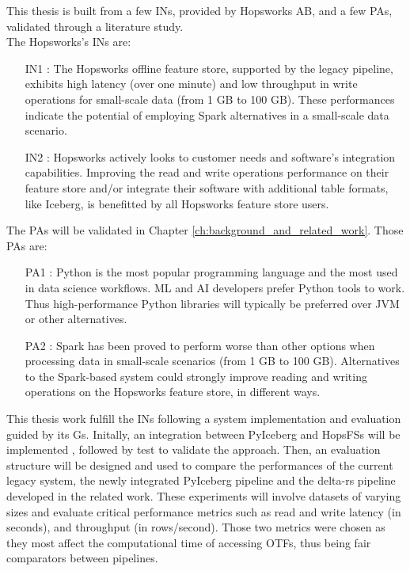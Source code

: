 This thesis is built from a few \glspl{IN}, provided by Hopsworks AB, and a few \glspl{PA}, validated through a literature study. \\ The Hopsworks's \glspl{IN} are:
\begin{itemize}
    \item[IN1 :] The Hopsworks offline feature store, supported by the legacy pipeline, exhibits high latency (over one minute) and low throughput in write operations for small-scale data (from 1 GB to 100 GB). These performances indicate the potential of employing Spark alternatives in a small-scale data scenario.
    \item[IN2 :] Hopsworks actively looks to customer needs and software's integration capabilities. Improving the read and write operations performance on their feature store and/or integrate their software with additional table formats, like Iceberg, is benefitted by all Hopsworks feature store users.
\end{itemize}
The \glspl{PA} will be validated in Chapter \ref{ch:background_and_related_work}. Those \glspl{PA} are: 
\begin{itemize}
    \item[PA1 :] Python is the most popular programming language and the most used in data science workflows. \gls{ML} and \gls{AI} developers prefer Python tools to work. Thus high-performance Python libraries will typically be preferred over \gls{JVM} or other alternatives.
    \item[PA2 :] Spark has been proved to perform worse than other options when processing data in small-scale scenarios (from 1 GB to 100 GB). Alternatives to the Spark-based system could strongly improve reading and writing operations on the Hopsworks feature store, in different ways.
\end{itemize}

This thesis work fulfill the \glspl{IN} following a system implementation and evaluation guided by its \glspl{G}. Initally, an integration between PyIceberg and \glspl{HopsFS} will be implemented \cite{niaziHopsFSScalingHierarchical2017}, followed by test to validate the approach. Then, an evaluation structure will be designed and used to compare the performances of the current legacy system, the newly integrated PyIceberg pipeline and the delta-rs pipeline developed in the related work. These experiments will involve datasets of varying sizes and evaluate critical performance metrics such as read and write latency (in seconds), and throughput (in rows/second). Those two metrics were chosen as they most affect the computational time of accessing \glspl{OTF}, thus being fair comparators between pipelines.